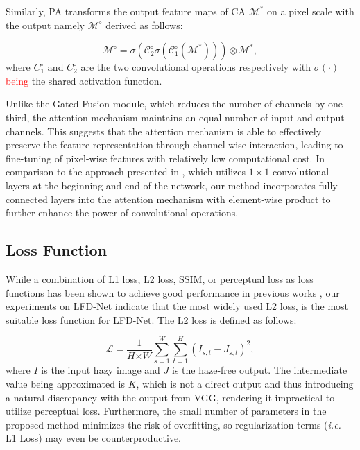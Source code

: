\documentclass[lettersize,journal]{IEEEtran}
\begin{document}
Similarly, PA transforms the output feature maps of CA $\mathcal{M}^*$ on a pixel scale with the output namely $\mathcal{M}^{\circ}$ derived as follows:

\begin{equation}
    \mathcal{M}^{\circ} = \sigma(\mathcal{C}_2^{\circ} \sigma (\mathcal{C}_1^{\circ}(\mathcal{M}^*))) \otimes \mathcal{M}^*, 
\end{equation}
where $C_1^{\circ}$ and $C_2^{\circ}$ are the two convolutional operations respectively with $\sigma(\cdot)$ \textcolor{red}{being} the shared activation function. 

Unlike the Gated Fusion module, which reduces the number of channels by one-third, the attention mechanism maintains an equal number of input and output channels. This suggests that the attention mechanism is able to effectively preserve the feature representation through channel-wise interaction, leading to fine-tuning of pixel-wise features with relatively low computational cost. In comparison to the approach presented in \cite{ullah2021light}, which utilizes $1 \times 1$ convolutional layers at the beginning and end of the network, our method incorporates fully connected layers into the attention mechanism with element-wise product to further enhance the power of convolutional operations.

\subsection{Loss Function}
While a combination of L1 loss, L2 loss, SSIM, or perceptual loss as loss functions has been shown to achieve good performance in previous works \cite{zhao2016loss, lim2017enhanced, rad2019srobb, guo2020joint}, our experiments on LFD-Net indicate that the most widely used L2 loss, is the most suitable loss function for LFD-Net. The L2 loss is defined as follows:

\begin{equation}
    \mathcal{L} = \frac{1}{\textit{H} \times \textit{W}} \sum_{s=1}^\textit{W} \sum_{t=1}^{\textit{H}} (I_{s,t} - J_{s,t})^2,
\end{equation}
where $I$ is the input hazy image and $J$ is the haze-free output. The intermediate value being approximated is $K$, which is not a direct output and thus introducing a natural discrepancy with the output from VGG, rendering it impractical to utilize perceptual loss. Furthermore, the small number of parameters in the proposed method minimizes the risk of overfitting, so regularization terms (\textit{i.e.} L1 Loss) may even be counterproductive.
\end{document}
